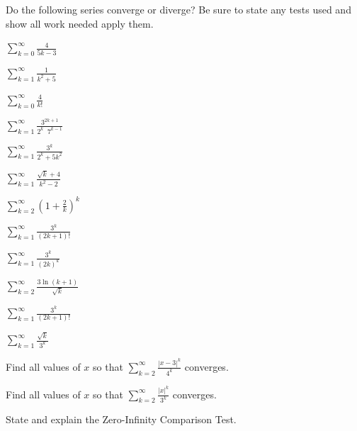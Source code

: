 \documentclass{exam}[12pt]
\begin{document}
\pagestyle{head}

\extraheadheight{-.3in}
\extrafootheight{-.3in} 


\vspace{.2in}
\large{

Do the following series converge or diverge? Be sure to state any
tests used and show all work needed apply them.

\begin{questions}

\question $\displaystyle
\sum_{k=0}^\infty \frac{4}{5k-3} $ 
\vspace{.3in}

\question $\displaystyle
\sum_{k=1}^\infty \frac{1}{k^2+5} $ 
\vspace{.3in}

\question $\displaystyle
\sum_{k=0}^\infty \frac{4}{k!} $ 
\vspace{.3in}

\question $\displaystyle
\sum_{k=1}^\infty \frac{3^{2k+1}}{2^k \; \;7^{k-1}} $
\vspace{.3in}

\question $\displaystyle
\sum_{k=1}^\infty \frac{3^k}{2^k + 5k^2} $ 
\vspace{.3in}

\question $\displaystyle
\sum_{k=1}^\infty \frac{\sqrt{ k}+4}{k^2 - 2} $ 
\vspace{.3in}

\question $\displaystyle
\sum_{k=2}^\infty \left(1 + \frac 2 k\right)^k $
\vspace{.3in}

\question $\displaystyle
\sum_{k=1}^\infty \frac{3^k}{(2k +1)!} $
\vspace{.3in}

\question $\displaystyle
\sum_{k=1}^\infty \frac{3^k}{(2k)^k} $ 
\vspace{.3in}

\question $\displaystyle \sum_{k=2}^\infty\frac{3\ln(k+1)}{\sqrt{k}}$
\vspace{.3in}

\question $\displaystyle
\sum_{k=1}^\infty \frac{3^k}{(2k +1)!} $ 
\vspace{.3in}

\question $\displaystyle
\sum_{k=1}^\infty \frac{\sqrt{ k}}{3^k } $
\vspace{.3in}

\question Find all values of $x$ so that $\sum_{k=2}^\infty 
\frac{|x-3|^k}{4^k}$ converges.
\vspace{.3in}

\question Find all values of $x$ so that $\sum_{k=2}^\infty 
\frac{|x|^k}{3^k}$ converges.


\vspace{.3in}
\question State and explain the Zero-Infinity Comparison Test.

\end{questions}

}
\end{document}
